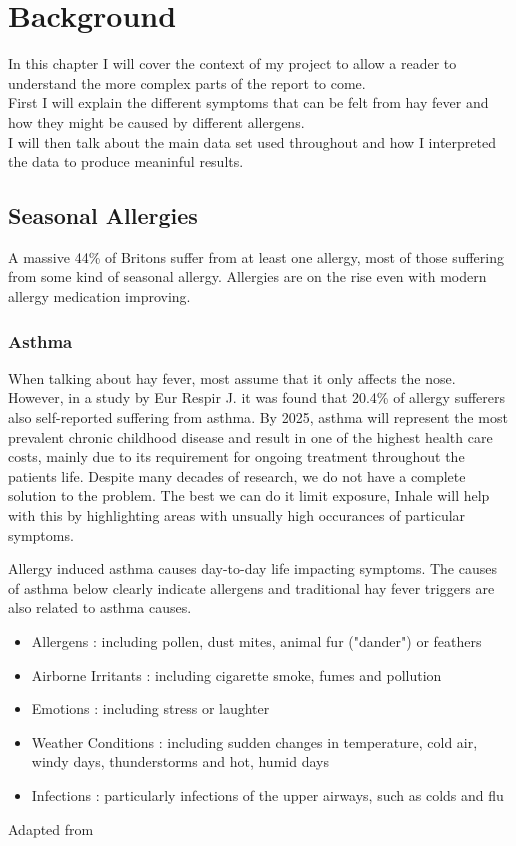 \chapter{Background}
\label{cha:back}

In this chapter I will cover the context of my project to allow a reader to understand the more complex parts of the report to come.\\
First I will explain the different symptoms that can be felt from hay fever and how they might be caused by different allergens.\\
I will then talk about the main data set used throughout and how I interpreted the data to produce meaninful results.\\

\section{Seasonal Allergies}
A massive 44\% of Britons suffer from at least one allergy, most of those suffering from some kind of seasonal allergy. Allergies are on the rise even with modern allergy medication improving.
\cite{mintelallergy}

\subsection{Asthma}
When talking about hay fever, most assume that it only affects the nose. However, in a study by Eur Respir J. it was found that 20.4\% of allergy sufferers also self-reported suffering from asthma\cite{rhinitis}. By 2025, asthma will represent the most prevalent chronic childhood disease and result in one of the highest health care costs, mainly due to its requirement for ongoing treatment throughout the patients life\cite{childhood}. Despite many decades of research, we do not have a complete solution to the problem. The best we can do it limit exposure, Inhale will help with this by highlighting areas with unsually high occurances of particular symptoms.

Allergy induced asthma causes day-to-day life impacting symptoms. The causes of asthma below clearly indicate allergens and traditional hay fever triggers are also related to asthma causes.\\


\begin{itemize}
  \item Allergens : including pollen, dust mites, animal fur ("dander") or feathers
  \item Airborne Irritants : including cigarette smoke, fumes and pollution
  \item Emotions : including stress or laughter
  \item Weather Conditions : including sudden changes in temperature, cold air, windy days, thunderstorms and hot, humid days
  \item Infections : particularly infections of the upper airways, such as colds and flu
\end{itemize}Adapted from \cite{urlasthmacauses}\\

